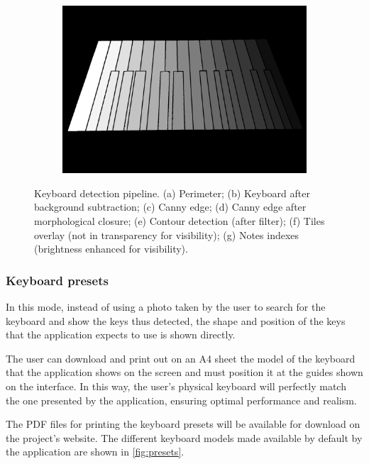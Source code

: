 \begin{figure}[ht]
\begin{subfigure}{0.49\textwidth}
		\caption{}
		\label{fig:tiles-overlay}
	\end{subfigure}
	\hfill
	\begin{subfigure}{0.49\textwidth}
		\centering
		\includegraphics[width=\textwidth]{images/application/45deg/notes-overlay}
		\caption{}
		\label{fig:notes}
	\end{subfigure}
	\caption{
		Keyboard detection pipeline.
		(a) Perimeter;
		(b) Keyboard after background subtraction;
		(c) Canny edge;
		(d) Canny edge after morphological closure;
		(e) Contour detection (after filter);
		(f) Tiles overlay (not in transparency for visibility);
		(g) Notes indexes (brightness enhanced for visibility).
	}
	\label{fig:preprocessing}
\end{figure}

\subsubsection{Keyboard presets}
In this mode, instead of using a photo taken by the user to search for the keyboard and show the keys thus detected,
the shape and position of the keys that the application expects to use is shown directly.

The user can download and print out on an A4 sheet the model of the keyboard that the
application shows on the screen and must position it at the guides shown on the interface.
In this way, the user's physical keyboard will perfectly match the one presented by the application,
ensuring optimal performance and realism.

The PDF files for printing the keyboard presets will be available for download on the project's website.
The different keyboard models made available by default by the application are shown in \autoref{fig:presets}.

